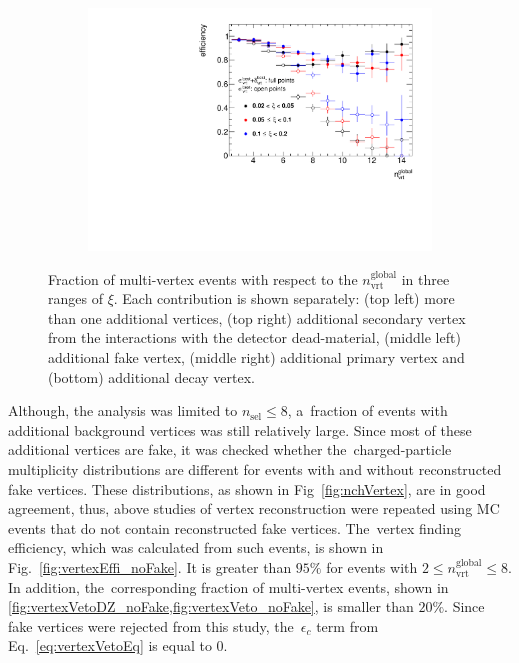 \begin{figure}[h!]
\begin{subfigure}{.47\textwidth}
		\includegraphics[width=\textwidth,page=7]{chapters/chrgSTAR/img/vertex/vertexEffi_ksi.pdf}
	\end{subfigure}
	\begin{minipage}{.47\textwidth}
			\caption{Fraction of multi-vertex events  with respect to the $n_\textrm{vrt}^\textrm{global}$ in three ranges of $\xi$. Each contribution is shown separately: (top left) more than one additional vertices, (top right) additional secondary vertex from the interactions with the detector dead-material, (middle left) additional fake vertex, (middle right) additional primary vertex and (bottom) additional decay vertex.}
			\label{fig:vertexVeto}
	\end{minipage}
\end{figure}

Although, the analysis was limited to $n_\textrm{sel}\leq8$, a~fraction  of events  with additional background vertices was still relatively large.
Since most of these additional vertices are fake, it was checked whether the~charged-particle multiplicity distributions are different for events with and without reconstructed fake vertices. These distributions, as shown in Fig~\ref{fig:nchVertex}, are in good agreement, thus, above studies of vertex reconstruction were repeated using \ac{MC} events that do not contain reconstructed fake vertices. The~vertex finding efficiency, which was  calculated from such events, is shown in Fig.~\ref{fig:vertexEffi_noFake}. It is greater than $95\%$ for events with $2 \leq n_\textrm{vrt}^\textrm{global}\leq 8$. 
  In addition, the~corresponding fraction of multi-vertex events, shown in \cref{fig:vertexVetoDZ_noFake,fig:vertexVeto_noFake}, is smaller than $20\%$. Since fake vertices were rejected from this study, the~$\epsilon_{c}$ term from Eq.~\eqref{eq:vertexVetoEq} is equal to $0$. 
  
